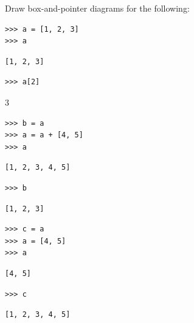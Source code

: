 \documentclass{exam}
\begin{document}
\begin{questions}


\begin{blocksection}
\question Draw box-and-pointer diagrams for the following:

\begin{lstlisting}
>>> a = [1, 2, 3]
>>> a
\end{lstlisting}
\begin{solution}[.25in]
\begin{lstlisting}
[1, 2, 3]
\end{lstlisting}
\end{solution}

\begin{lstlisting}
>>> a[2]
\end{lstlisting}
\begin{solution}[.25in]
3
\end{solution}

\begin{lstlisting}
>>> b = a
>>> a = a + [4, 5]
>>> a
\end{lstlisting}
\begin{solution}[.25in]
\begin{lstlisting}
[1, 2, 3, 4, 5]
\end{lstlisting}
\end{solution}
\end{blocksection}
\begin{blocksection}
\begin{lstlisting}
>>> b
\end{lstlisting}
\begin{solution}[.25in]
\begin{lstlisting}
[1, 2, 3]
\end{lstlisting}
\end{solution}

\begin{lstlisting}
>>> c = a
>>> a = [4, 5]
>>> a
\end{lstlisting}
\begin{solution}[.25in]
\begin{lstlisting}
[4, 5]
\end{lstlisting}
\end{solution}

\begin{lstlisting}
>>> c
\end{lstlisting}
\begin{solution}[.25in]
\begin{lstlisting}
[1, 2, 3, 4, 5]
\end{lstlisting}
\end{solution}


\end{blocksection}
\end{questions}
\end{document}
